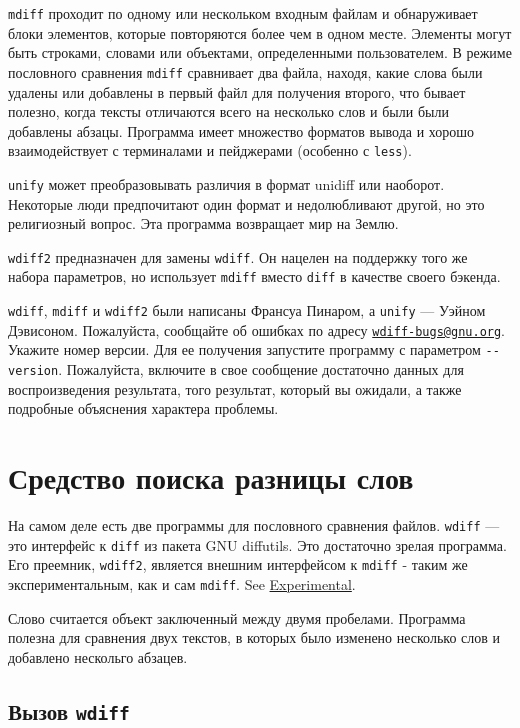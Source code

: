 \texttt{mdiff} проходит по одному или нескольком входным файлам и
обнаруживает блоки элементов, которые повторяются более чем в одном
месте. Элементы могут быть строками, словами или объектами,
определенными пользователем. В режиме пословного сравнения
\texttt{mdiff} сравнивает два файла, находя, какие слова были удалены
или добавлены в первый файл для получения второго, что бывает полезно,
когда тексты отличаются всего на несколько слов и были были добавлены
абзацы. Программа имеет множество форматов вывода и хорошо
взаимодействует с терминалами и пейджерами (особенно с \texttt{less}).

\texttt{unify} может преобразовывать различия в формат unidiff или
наоборот. Некоторые люди предпочитают один формат и недолюбливают
другой, но это религиозный вопрос. Эта программа возвращает мир на
Землю.

\texttt{wdiff2} предназначен для замены \texttt{wdiff}. Он нацелен на
поддержку того же набора параметров, но использует \texttt{mdiff} вместо
\texttt{diff} в качестве своего бэкенда.

\texttt{wdiff}, \texttt{mdiff} и \texttt{wdiff2} были написаны Франсуа
Пинаром, а \texttt{unify} --- Уэйном Дэвисоном. Пожалуйста, сообщайте об
ошибках по адресу
\href{mailto:wdiff-bugs@gnu.org}{\nolinkurl{wdiff-bugs@gnu.org}}.
Укажите номер версии. Для ее получения запустите программу с параметром
\texttt{-\/-version}. Пожалуйста, включите в свое сообщение достаточно
данных для воспроизведения результата, того результат, который вы
ожидали, а также подробные объяснения характера проблемы.

\hypertarget{wdiff}{%
\section{Средство поиска разницы слов}\label{wdiff}}

На самом деле есть две программы для пословного сравнения файлов.
\texttt{wdiff} --- это интерфейс к \texttt{diff} из пакета GNU
diffutils. Это достаточно зрелая программа. Его преемник,
\texttt{wdiff2}, является внешним интерфейсом к \texttt{mdiff} - таким
же экспериментальным, как и сам \texttt{mdiff}. See
\protect\hyperlink{Experimental}{Experimental}.

Слово считается объект заключенный между двумя пробелами. Программа
полезна для сравнения двух текстов, в которых было изменено несколько
слов и добавлено нескольго абзацев.

\hypertarget{_0412_044b_0437_043e_0432-wdiff}{%
\subsection{\texorpdfstring{Вызов
\texttt{wdiff}}{Вызов wdiff}}\label{_0412_044b_0437_043e_0432-wdiff}}

